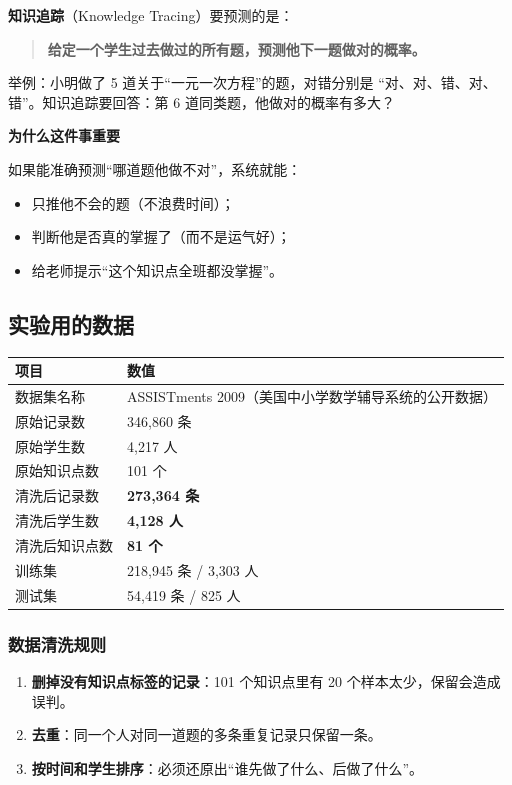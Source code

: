 \documentclass[UTF8,a4paper,11pt]{ctexart}
\newenvironment{explainbox}[1]
{\begin{center}\begin{minipage}{0.94\textwidth}\colorbox{boxbg}{\parbox{0.92\textwidth}{\textbf{#1}\par\vspace{2pt}}}}
{\end{minipage}\end{center}}
\newcommand{\term}[1]{\textbf{#1}}
\begin{document}
\term{知识追踪}（Knowledge Tracing）要预测的是：

\begin{quote}
\textbf{给定一个学生过去做过的所有题，预测他下一题做对的概率。}
\end{quote}

举例：小明做了 5 道关于“一元一次方程”的题，对错分别是
“对、对、错、对、错”。知识追踪要回答：第 6 道同类题，他做对的概率有多大？

\begin{explainbox}{为什么这件事重要}
如果能准确预测“哪道题他做不对”，系统就能：
\begin{itemize}[leftmargin=1.4em,itemsep=1pt]
\item 只推他不会的题（不浪费时间）；
\item 判断他是否真的掌握了（而不是运气好）；
\item 给老师提示“这个知识点全班都没掌握”。
\end{itemize}
\end{explainbox}

\subsection{实验用的数据}

\begin{center}
\begin{tabular}{p{4.2cm}p{9.6cm}}
\toprule
\textbf{项目} & \textbf{数值} \\
\midrule
数据集名称 & ASSISTments 2009（美国中小学数学辅导系统的公开数据） \\
原始记录数 & 346,860 条 \\
原始学生数 & 4,217 人 \\
原始知识点数 & 101 个 \\
清洗后记录数 & \textbf{273,364 条} \\
清洗后学生数 & \textbf{4,128 人} \\
清洗后知识点数 & \textbf{81 个} \\
训练集 & 218,945 条 / 3,303 人 \\
测试集 & 54,419 条 / 825 人 \\
\bottomrule
\end{tabular}
\end{center}

\subsubsection{数据清洗规则}

\begin{enumerate}[leftmargin=1.8em]
\item \textbf{删掉没有知识点标签的记录}：101 个知识点里有 20 个样本太少，保留会造成误判。
\item \textbf{去重}：同一个人对同一道题的多条重复记录只保留一条。
\item \textbf{按时间和学生排序}：必须还原出“谁先做了什么、后做了什么”。
\end{enumerate}
\end{document}
